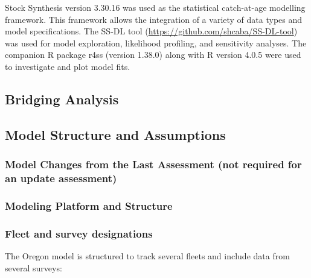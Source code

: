 \documentclass[11pt,
  english,
  letterpaper,
]{article}
\begin{document}
Stock Synthesis version 3.30.16 was used as the statistical catch-at-age modelling framework. This framework allows the integration of a variety of data types and model specifications. The SS-DL tool (\url{https://github.com/shcaba/SS-DL-tool}) was used for model exploration, likelihood profiling, and sensitivity analyses. The companion R package r4ss (version 1.38.0) along with R version 4.0.5 were used to investigate and plot model fits.

\hypertarget{bridging-analysis}{%
\subsection{Bridging Analysis}\label{bridging-analysis}}

\hypertarget{model-structure-and-assumptions}{%
\subsection{Model Structure and Assumptions}\label{model-structure-and-assumptions}}

\hypertarget{model-changes-from-the-last-assessment-not-required-for-an-update-assessment}{%
\subsubsection{Model Changes from the Last Assessment (not required for an update assessment)}\label{model-changes-from-the-last-assessment-not-required-for-an-update-assessment}}

\hypertarget{modeling-platform-and-structure}{%
\subsubsection{Modeling Platform and Structure}\label{modeling-platform-and-structure}}

\hypertarget{fleet-and-survey-designations}{%
\subsubsection{Fleet and survey designations}\label{fleet-and-survey-designations}}

The Oregon model is structured to track several fleets and include data from several surveys:
\end{document}
